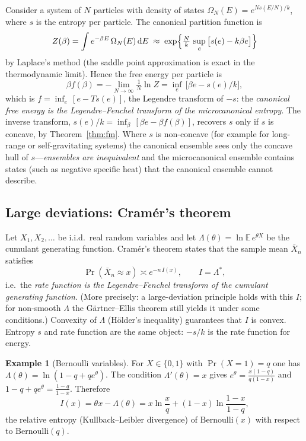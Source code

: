 \documentclass[11pt,a4paper]{article}
\newcommand{\E}{\mathbb{E}}
\newcommand{\dd}{\mathrm{d}}
\theoremstyle{plain}
\theoremstyle{definition}
\newtheorem{example}[theorem]{Example}
\theoremstyle{remark}
\begin{document}
Consider a system of $N$ particles with density of states
$\Omega_N(E)=e^{N s(E/N)/k}$, where $s$ is the entropy per particle.  The
canonical partition function is
\[
  Z(\beta)=\int e^{-\beta E}\,\Omega_N(E)\,\dd E
  \;\approx\;\exp\Bigl\{\tfrac Nk\,\sup_e\,\bigl[s(e)-k\beta e\bigr]\Bigr\}
\]
by Laplace's method (the saddle point approximation is exact in the
thermodynamic limit).  Hence the free energy per particle is
\[
  \beta f(\beta)=-\lim_{N\to\infty}\tfrac1N\ln Z
  =\inf_e\,\bigl[\beta e-s(e)/k\bigr],
\]
which is $f=\inf_e\,[e-Ts(e)]$, the Legendre transform of $-s$:
the \emph{canonical free energy is the Legendre--Fenchel transform of the
microcanonical entropy}.  The inverse transform,
$s(e)/k=\inf_\beta\,[\beta e-\beta f(\beta)]$, recovers $s$ only if $s$ is
concave, by Theorem~\ref{thm:fm}.  Where $s$ is non-concave (for example
for long-range or self-gravitating systems) the canonical ensemble sees only
the concave hull of $s$---\emph{ensembles are inequivalent} and the
microcanonical ensemble contains states (such as negative specific heat) that
the canonical ensemble cannot describe.

\subsection{Large deviations: Cram\'er's theorem}

Let $X_1,X_2,\dots$ be i.i.d.\ real random variables and let
$\Lambda(\theta)=\ln\E\,e^{\theta X}$ be the cumulant generating function.
Cram\'er's theorem states that the sample mean $\bar X_n$ satisfies
\[
  \Pr(\bar X_n\approx x)\asymp e^{-n\,I(x)},\qquad I=\Lambda^*,
\]
i.e.\ the \emph{rate function is the Legendre--Fenchel transform of the cumulant
generating function}.  (More precisely: a large-deviation principle holds
with this $I$; for non-smooth $\Lambda$ the G\"artner--Ellis theorem still
yields it under some conditions.)  Convexity of $\Lambda$ (H\"older's
inequality) guarantees that $I$ is convex.  Entropy $s$ and rate function are
the same object: $-s/k$ is the rate function for energy.

\begin{example}[Bernoulli variables]
For $X\in\{0,1\}$ with $\Pr(X=1)=q$ one has $\Lambda(\theta)=\ln(1-q+qe^\theta)$.
The condition $\Lambda'(\theta)=x$ gives $e^\theta=\frac{x(1-q)}{q(1-x)}$ and
$1-q+qe^\theta=\frac{1-q}{1-x}$.  Therefore
\[
  I(x)=\theta x-\Lambda(\theta)=x\ln\frac xq+(1-x)\ln\frac{1-x}{1-q},
\]
the relative entropy (Kullback--Leibler divergence) of $\mathrm{Bernoulli}(x)$
with respect to $\mathrm{Bernoulli}(q)$.
\end{example}
\end{document}
